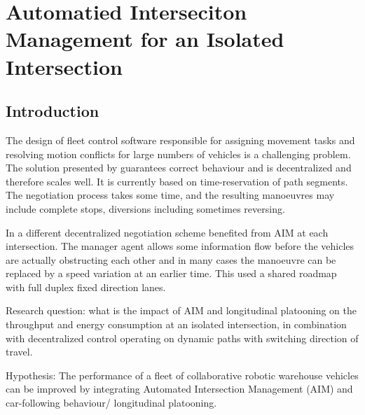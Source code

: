 
\chapter{Automatied Interseciton Management for an Isolated Intersection}
\section{Introduction}

The design of fleet control software responsible for assigning movement tasks and resolving motion conflicts for large numbers of vehicles is a challenging problem. The solution presented by \cite{Draganjac2020} guarantees correct behaviour and is decentralized and therefore scales well. It is currently based on time-reservation of path segments. The negotiation process takes some time, and the resulting manoeuvres may include complete stops, diversions including sometimes reversing. 

In \cite{Digani2019} a different decentralized negotiation scheme benefited from AIM at each intersection. The manager agent allows some information flow before the vehicles are actually obstructing each other and in many cases the manoeuvre can be replaced by a speed variation at an earlier time. This used a shared roadmap with full duplex fixed direction lanes.



Research question: what is the impact of AIM and longitudinal platooning on the throughput and energy consumption at an isolated intersection, in combination with decentralized control operating on dynamic paths with switching direction of travel. 

Hypothesis: The performance of a fleet of collaborative robotic warehouse vehicles can be improved by integrating Automated Intersection Management (AIM) and car-following behaviour/ longitudinal platooning.

